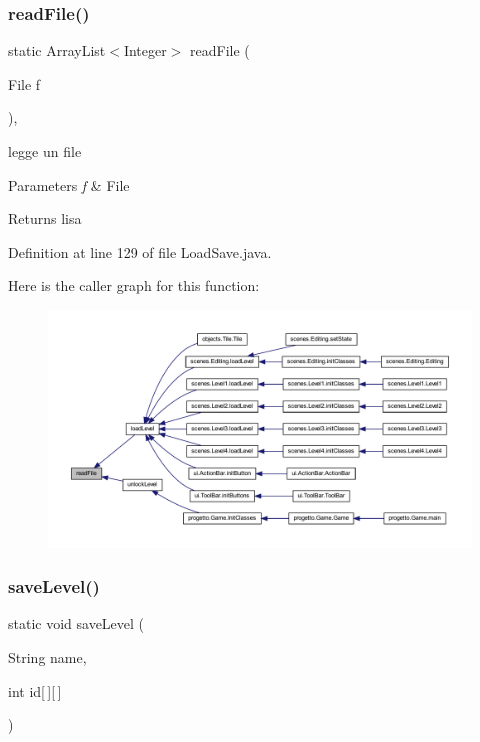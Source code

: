 \subsubsection{\texorpdfstring{read\+File()}{readFile()}}
{\footnotesize\ttfamily static Array\+List$<$Integer$>$ read\+File (\begin{DoxyParamCaption}\item[{File}]{f }\end{DoxyParamCaption})\hspace{0.3cm}{\ttfamily [static]}, {\ttfamily [private]}}



legge un file 


\begin{DoxyParams}{Parameters}
{\em f} & File \\
\hline
\end{DoxyParams}
\begin{DoxyReturn}{Returns}
lisa 
\end{DoxyReturn}


Definition at line 129 of file Load\+Save.\+java.

Here is the caller graph for this function\+:
\nopagebreak
\begin{figure}[H]
\begin{center}
\leavevmode
\includegraphics[width=350pt]{classhelpz_1_1_load_save_a62d3bd4e3f361e1f99bd9d21a7d21b0d_icgraph}
\end{center}
\end{figure}
\mbox{\label{classhelpz_1_1_load_save_ae7a60134f1712407689bfe3c45bc04a1}} 
\subsubsection{\texorpdfstring{save\+Level()}{saveLevel()}\hspace{0.1cm}{\footnotesize\ttfamily [1/2]}}
{\footnotesize\ttfamily static void save\+Level (\begin{DoxyParamCaption}\item[{String}]{name,  }\item[{int}]{id\mbox{[}$\,$\mbox{]}\mbox{[}$\,$\mbox{]} }\end{DoxyParamCaption})\hspace{0.3cm}{\ttfamily [static]}}



